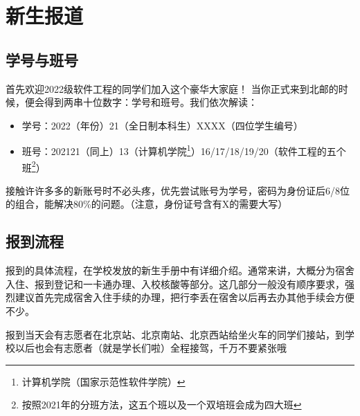 \section{新生报道}

\subsection*{学号与班号}

首先欢迎2022级软件工程的同学们加入这个豪华大家庭！
当你正式来到北邮的时候，便会得到两串十位数字：学号和班号。我们依次解读：
\begin{itemize}
    \kaishu
    \item 学号：2022（年份）21（全日制本科生）XXXX（四位学生编号）
    \item 班号：202121（同上）13（计算机学院\footnote{计算机学院（国家示范性软件学院）}）16/17/18/19/20（软件工程的五个班\footnote{按照2021年的分班方法，这五个班以及一个双培班会成为四大班}）
\end{itemize}

接触许许多多的新账号时不必头疼，优先尝试账号为学号，密码为身份证后6/8位的组合，能解决80\%的问题。（注意，身份证号含有X的需要大写）

\subsection*{报到流程}


报到的具体流程，在学校发放的新生手册中有详细介绍。通常来讲，大概分为宿舍入住、报到登记和一卡通办理、入校核酸等部分。这几部分一般没有顺序要求，强烈建议首先完成宿舍入住手续的办理，把行李丢在宿舍以后再去办其他手续会方便不少。

报到当天会有志愿者在北京站、北京南站、北京西站给坐火车的同学们接站，到学校以后也会有志愿者（就是学长们啦）全程接驾，千万不要紧张哦~

